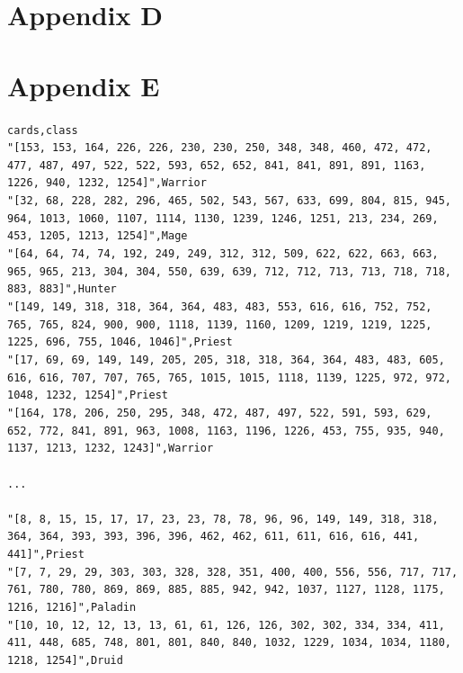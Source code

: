 \documentclass{report} %
\begin{document}
\section*{Appendix D}


\section*{Appendix E}
\texttt{cards,class\\
"[153, 153, 164, 226, 226, 230, 230, 250, 348, 348, 460, 472, 472, 477, 487, 497, 522, 522, 593, 652, 652, 841, 841, 891, 891, 1163, 1226, 940, 1232, 1254]",Warrior\\
"[32, 68, 228, 282, 296, 465, 502, 543, 567, 633, 699, 804, 815, 945, 964, 1013, 1060, 1107, 1114, 1130, 1239, 1246, 1251, 213, 234, 269, 453, 1205, 1213, 1254]",Mage\\
"[64, 64, 74, 74, 192, 249, 249, 312, 312, 509, 622, 622, 663, 663, 965, 965, 213, 304, 304, 550, 639, 639, 712, 712, 713, 713, 718, 718, 883, 883]",Hunter\\
"[149, 149, 318, 318, 364, 364, 483, 483, 553, 616, 616, 752, 752, 765, 765, 824, 900, 900, 1118, 1139, 1160, 1209, 1219, 1219, 1225, 1225, 696, 755, 1046, 1046]",Priest\\
"[17, 69, 69, 149, 149, 205, 205, 318, 318, 364, 364, 483, 483, 605, 616, 616, 707, 707, 765, 765, 1015, 1015, 1118, 1139, 1225, 972, 972, 1048, 1232, 1254]",Priest\\
"[164, 178, 206, 250, 295, 348, 472, 487, 497, 522, 591, 593, 629, 652, 772, 841, 891, 963, 1008, 1163, 1196, 1226, 453, 755, 935, 940, 1137, 1213, 1232, 1243]",Warrior\\ \\
...\\ \\
"[8, 8, 15, 15, 17, 17, 23, 23, 78, 78, 96, 96, 149, 149, 318, 318, 364, 364, 393, 393, 396, 396, 462, 462, 611, 611, 616, 616, 441, 441]",Priest\\
"[7, 7, 29, 29, 303, 303, 328, 328, 351, 400, 400, 556, 556, 717, 717, 761, 780, 780, 869, 869, 885, 885, 942, 942, 1037, 1127, 1128, 1175, 1216, 1216]",Paladin\\
"[10, 10, 12, 12, 13, 13, 61, 61, 126, 126, 302, 302, 334, 334, 411, 411, 448, 685, 748, 801, 801, 840, 840, 1032, 1229, 1034, 1034, 1180, 1218, 1254]",Druid\\
}
\end{document}
